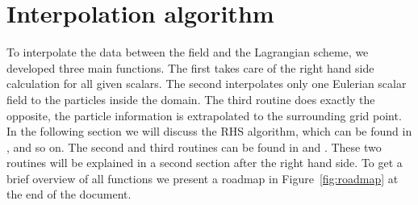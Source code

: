 \documentclass[12pt]{article}
\begin{document}
\section{Interpolation algorithm}
\label{sec:interpolation}
To interpolate the data between the field and the Lagrangian scheme, we developed three main functions. The first takes care of the right hand side calculation for all given scalars. The second interpolates only one Eulerian scalar field to the particles inside the domain. The third routine does exactly the opposite, the particle information is extrapolated to the surrounding grid point. In the following section we will discuss the RHS algorithm, which can be found in ,  and so on. The second and third routines can be found in  and . These two routines will be explained in a second section after the right hand side. To get a brief overview of all functions we present a roadmap in Figure~\ref{fig:roadmap} at the end of the document. 
\end{document}
